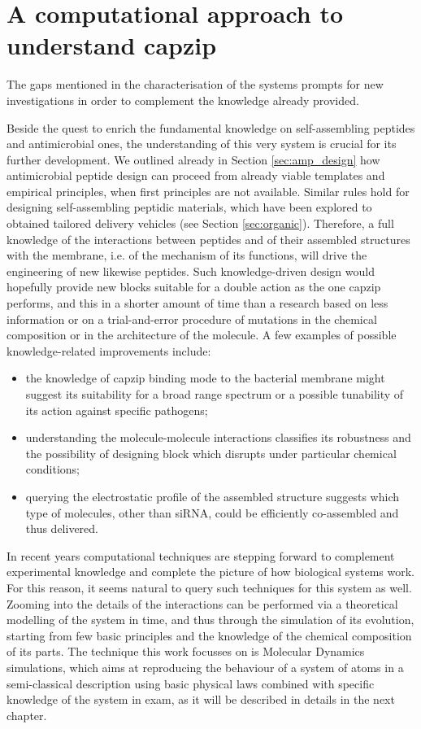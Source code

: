 \section{A computational approach to understand capzip}

The gaps mentioned in the characterisation of the systems prompts for new investigations in order to complement the knowledge already provided.

Beside the quest to enrich the fundamental knowledge on self-assembling peptides and antimicrobial ones, the understanding of this very system is crucial for its further development. We outlined already in Section \ref{sec:amp_design} how antimicrobial peptide design can proceed from already viable templates and empirical principles, when first principles are not available. Similar rules hold for designing self-assembling peptidic materials, which have been explored to obtained tailored delivery vehicles (see Section \ref{sec:organic}).
%
Therefore, a full knowledge of the interactions between peptides and of their assembled structures with the membrane, i.e. of the mechanism of its functions, will drive the engineering of new likewise peptides. Such knowledge-driven design would hopefully provide new blocks suitable for a double action as the one capzip performs, and this in a shorter amount of time than a research based on less information or on a trial-and-error procedure of mutations in the chemical composition or in the architecture of the molecule. A few examples of possible knowledge-related improvements include:
\begin{itemize}
\item the knowledge of capzip binding mode to the bacterial membrane might suggest its suitability for a broad range spectrum or a possible tunability of its action against specific pathogens;
\item understanding the molecule-molecule interactions classifies its robustness and the possibility of designing block which disrupts under particular chemical conditions;
\item querying the electrostatic profile of the assembled structure suggests which type of molecules, other than siRNA, could be efficiently co-assembled and thus delivered.
\end{itemize}

In recent years computational techniques are stepping forward to complement experimental knowledge and complete the picture of how biological systems work. For this reason, it seems natural to query such techniques for this system as well. Zooming into the details of the interactions can be performed via a theoretical modelling of the system in time, and thus through the simulation of its evolution, starting from few basic principles and the knowledge of the chemical composition of its parts. The technique this work focusses on is Molecular Dynamics simulations, which aims at reproducing the behaviour of a system of atoms in a semi-classical description using basic physical laws combined with specific knowledge of the system in exam, as it will be described in details in the next chapter.


